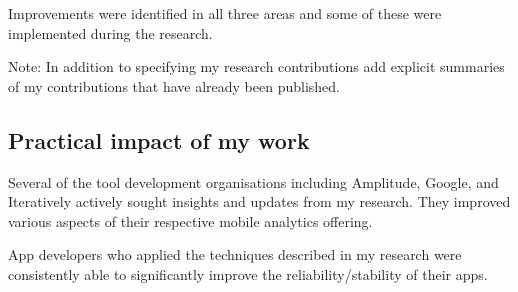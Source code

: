 Improvements were identified in all three areas and some of these were implemented during the research. 

Note: In addition to specifying my research contributions add explicit summaries of my contributions that have already been published.

\subsection{Practical impact of my work}
Several of the tool development organisations including Amplitude, Google, and Iteratively actively sought insights and updates from my research. They improved various aspects of their respective mobile analytics offering.

App developers who applied the techniques described in my research were consistently able to significantly improve the reliability/stability of their apps.
